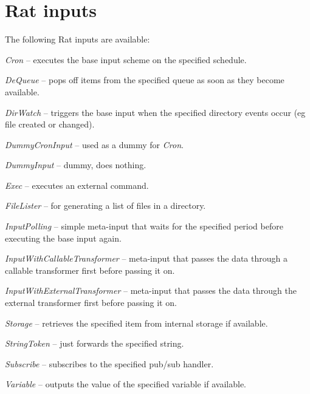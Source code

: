 \documentclass[a4paper]{book}
\begin{document}
\section{Rat inputs}
The following Rat inputs are available:
\begin{tight_itemize}
  \item \textit{Cron} -- executes the base input scheme on the specified schedule.
  \item \textit{DeQueue} -- pops off items from the specified queue as soon as they become available.
  \item \textit{DirWatch} -- triggers the base input when the specified directory events occur (eg file created or changed).
  \item \textit{DummyCronInput} -- used as a dummy for \textit{Cron}.
  \item \textit{DummyInput} -- dummy, does nothing.
  \item \textit{Exec} -- executes an external command.
  \item \textit{FileLister} -- for generating a list of files in a directory.
  \item \textit{InputPolling} -- simple meta-input that waits for the specified period before executing the base input again.
  \item \textit{InputWithCallableTransformer} -- meta-input that passes the data through a callable transformer first before passing it on.
  \item \textit{InputWithExternalTransformer} -- meta-input that passes the data through the external transformer first before passing it on.
  \item \textit{Storage} -- retrieves the specified item from internal storage if available.
  \item \textit{StringToken} -- just forwards the specified string.
  \item \textit{Subscribe} -- subscribes to the specified pub/sub handler.
  \item \textit{Variable} -- outputs the value of the specified variable if available.
\end{tight_itemize}
\end{document}

